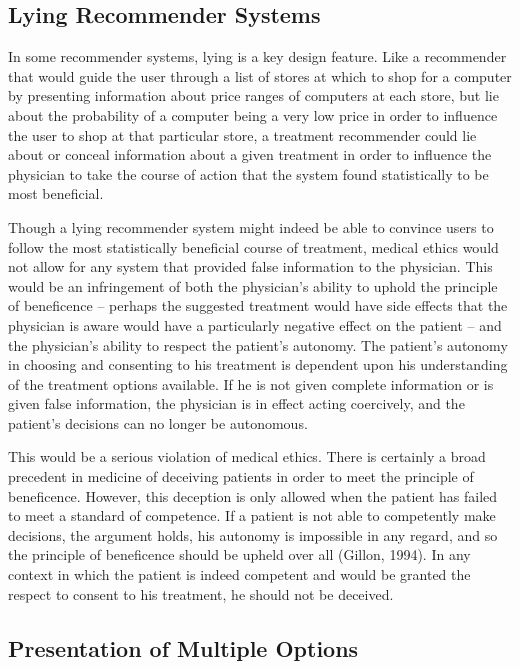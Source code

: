 \documentclass[]{spie}  %
\begin{document}
\subsection{Lying Recommender Systems}

In some recommender systems, lying is a key design feature. Like a recommender that would guide the user through a list of stores at which to shop for a computer by presenting information about price ranges of computers at each store, but lie about the probability of a computer being a very low price in order to influence the user to shop at that particular store, a treatment recommender could lie about or conceal information about a given treatment in order to influence the physician to take the course of action that the system found statistically to be most beneficial.

Though a lying recommender system might indeed be able to convince users to follow the most statistically beneficial course of treatment, medical ethics would not allow for any system that provided false information to the physician. This would be an infringement of both the physician’s ability to uphold the principle of beneficence -- perhaps the suggested treatment would have side effects that the physician is aware would have a particularly negative effect on the patient -- and the physician’s ability to respect the patient’s autonomy. The patient’s autonomy in choosing and consenting to his treatment is dependent upon his understanding of the treatment options available. If he is not given complete information or is given false information, the physician is in effect acting coercively, and the patient’s decisions can no longer be autonomous.

This would be a serious violation of medical ethics. There is certainly a broad precedent in medicine of deceiving patients in order to meet the principle of beneficence. However, this deception is only allowed when the patient has failed to meet a standard of competence. If a patient is not able to competently make decisions, the argument holds, his autonomy is impossible in any regard, and so the principle of beneficence should be upheld over all (Gillon, 1994). In any context in which the patient is indeed competent and would be granted the respect to consent to his treatment, he should not be deceived.

\subsection{Presentation of Multiple Options}
\end{document}
